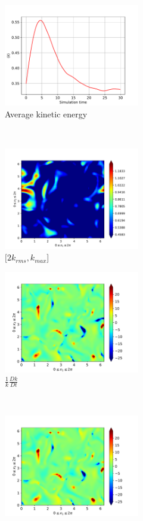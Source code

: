 \begin{figure}[H]
    \begin{subfigure}[H]{0.45\textwidth}
        \includegraphics[height=1.75in]{media/run-cds-65/ke-average1340}
        \caption{Average kinetic energy}
    \end{subfigure}
    ~
    \begin{subfigure}[H]{0.45\textwidth}
        \includegraphics[height=1.75in]{media/run-cds-65/ke-2-1340}
        \caption{$[2k_{rms}, k_{max} $] }
    \end{subfigure}
    \newline
    \begin{subfigure}[H]{0.45\textwidth}
        \includegraphics[height=1.75in]{media/run-cds-65/ke-1340}
        \caption{$\frac{1}{k} \frac{D k}{Dt}$}
    \end{subfigure}
    ~
    \begin{subfigure}{0.45\textwidth}
        \includegraphics[height=1.75in]{media/run-cds-65/A-ke-1340}

\end{subfigure}
\end{figure}
